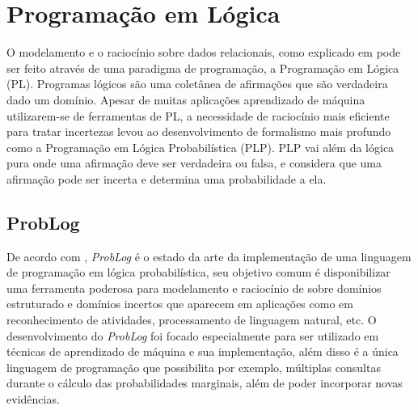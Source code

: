 \documentclass[
	12pt,				%
    oneside,			%
	a4paper,			%
	english,			%
	french,				%
	spanish,			%
	brazil,				%
	]{abntex2}
\begin{document}








\newpage
\section {Programação em Lógica}
 O modelamento e o raciocínio sobre dados relacionais, como explicado em  pode ser feito através de uma paradigma de programação, a Programação em Lógica (PL). Programas lógicos são uma coletânea de afirmações que são verdadeira dado um domínio. Apesar de muitas aplicações aprendizado de máquina utilizarem-se de ferramentas de PL, a necessidade de raciocínio mais eficiente para tratar incertezas levou ao desenvolvimento de formalismo mais profundo como a Programação em Lógica Probabilística (PLP). PLP vai além da lógica pura onde uma afirmação deve ser verdadeira ou falsa, e considera que uma afirmação pode ser incerta e determina uma probabilidade a ela.


\subsection{ProbLog}

De acordo com , \textit{ProbLog} é o estado da arte da implementação de uma linguagem de programação em lógica probabilística, seu objetivo comum é disponibilizar uma ferramenta poderosa para modelamento e raciocínio de sobre domínios estruturado e domínios incertos que aparecem em aplicações como em reconhecimento de atividades, processamento de linguagem natural, etc. O desenvolvimento do \textit{ProbLog} foi focado especialmente para ser utilizado em técnicas de aprendizado de máquina e sua implementação, além disso é a única linguagem de programação que possibilita por exemplo, múltiplas consultas durante o cálculo das probabilidades marginais, além de poder incorporar novas evidências.
\end{document}
